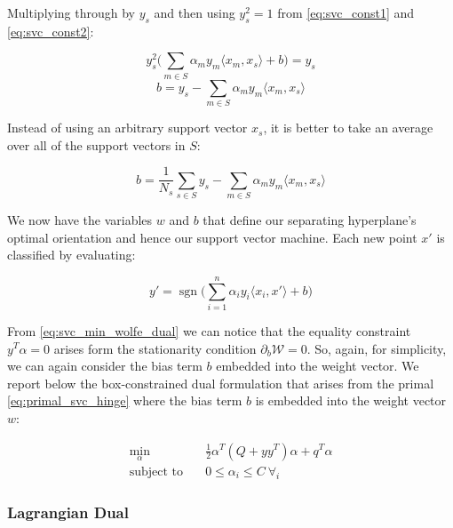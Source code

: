 Multiplying through by $y_s$ and then using $y_s^2=1$ from \ref{eq:svc_const1} and \ref{eq:svc_const2}:

\begin{equation}
	y_s^2\big(\sum_{m\in S}\alpha_m y_m \langle x_m, x_s \rangle +b\big)=y_s \label{eq:svc_sv_sq_const2}
\end{equation}
\begin{equation}
	b=y_s-\sum_{m\in S}\alpha_m y_m \langle x_m, x_s \rangle \label{eq:svc_b}
\end{equation}


Instead of using an arbitrary support vector $x_s$, it is better to take an average over all of the support vectors in $S$:

\begin{equation}
	b=\frac{1}{N_s}\sum_{s\in S} y_s-\sum_{m\in S}\alpha_m y_m \langle x_m, x_s \rangle \label{eq:svc_b_avg}
\end{equation}

We now have the variables $w$ and $b$ that define our separating hyperplane's optimal orientation and hence our support vector machine. Each new point $x'$ is classified by evaluating:

\begin{equation}
    y'=\operatorname{sgn}\big(\sum_{i=1}^{n}\alpha_i y_i\langle x_i, x' \rangle+b\big) \label{eq:svc_pred}
\end{equation}

From \ref{eq:svc_min_wolfe_dual} we can notice that the equality constraint $y^T \alpha = 0$ arises form the stationarity condition $\partial_{{b}} \mathcal{W}=0$. So, again, for simplicity, we can again consider the bias term $b$ embedded into the weight vector. We report below the box-constrained dual formulation \cite{hsu2002simple} that arises from the primal \ref{eq:primal_svc_hinge} where the bias term $b$ is embedded into the weight vector $w$:

\begin{equation}
    \begin{aligned}
        \min_{\alpha} \quad & \frac{1}{2} \alpha^T (Q + yy^T)\alpha+q^T\alpha \\
            \textrm{subject to} \quad & 0\leq\alpha_i\leq C \ \forall_i
    \end{aligned} \label{eq:svc_min_bcqp_wolf_dual}
\end{equation}

\subsubsection{Lagrangian Dual}

